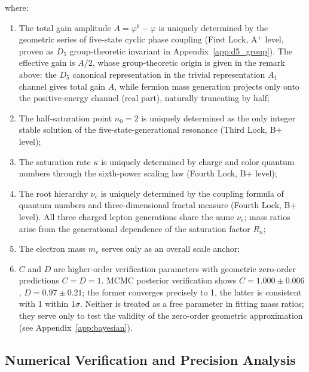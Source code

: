 \documentclass[12pt,a4paper,twocolumn]{article}
\renewcommand{\phi}{\varphi}
\begin{document}
where:
\begin{enumerate}
\item The total gain amplitude $A = \phi^6-\phi$ is uniquely determined by the geometric series of five-state cyclic phase coupling (First Lock, A$^+$ level, proven as $D_5$ group-theoretic invariant in Appendix~\ref{app:d5_group}). The effective gain is $A/2$, whose group-theoretic origin is given in the remark above: the $D_5$ canonical representation in the trivial representation $A_1$ channel gives total gain $A$, while fermion mass generation projects only onto the positive-energy channel (real part), naturally truncating by half;
\item The half-saturation point $n_0 = 2$ is uniquely determined as the only integer stable solution of the five-state-generational resonance (Third Lock, B+ level);
\item The saturation rate $\kappa$ is uniquely determined by charge and color quantum numbers through the sixth-power scaling law (Fourth Lock, B+ level);
\item The root hierarchy $\nu_e$ is uniquely determined by the coupling formula of quantum numbers and three-dimensional fractal measure (Fourth Lock, B+ level). All three charged lepton generations share the same $\nu_e$; mass ratios arise from the generational dependence of the saturation factor $R_n$;
\item The electron mass $m_e$ serves only as an overall scale anchor;
\item $C$ and $D$ are higher-order verification parameters with geometric zero-order predictions $C=D=1$. MCMC posterior verification shows $C=1.000\pm0.006$, $D=0.97\pm0.21$; the former converges precisely to 1, the latter is consistent with 1 within $1\sigma$. Neither is treated as a free parameter in fitting mass ratios; they serve only to test the validity of the zero-order geometric approximation (see Appendix~\ref{app:bayesian}).
\end{enumerate}

\subsection{Numerical Verification and Precision Analysis}
\end{document}
